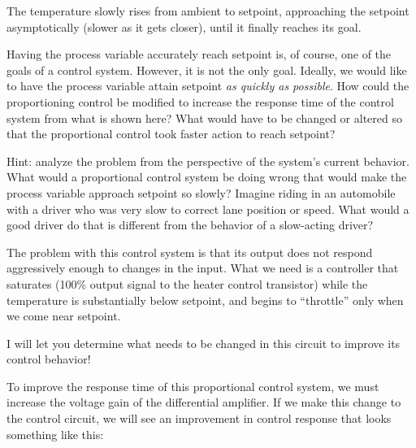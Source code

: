 The temperature slowly rises from ambient to setpoint, approaching the setpoint asymptotically (slower as it gets closer), until it finally reaches its goal.

Having the process variable accurately reach setpoint is, of course, one of the goals of a control system.  However, it is not the only goal.  Ideally, we would like to have the process variable attain setpoint {\it as quickly as possible}.  How could the proportioning control be modified to increase the response time of the control system from what is shown here?  What would have to be changed or altered so that the proportional control took faster action to reach setpoint?

Hint: analyze the problem from the perspective of the system's current behavior.  What would a proportional control system be doing wrong that would make the process variable approach setpoint so slowly?  Imagine riding in an automobile with a driver who was very slow to correct lane position or speed.  What would a good driver do that is different from the behavior of a slow-acting driver?
 






The problem with this control system is that its output does not respond aggressively enough to changes in the input.  What we need is a controller that saturates (100\% output signal to the heater control transistor) while the temperature is substantially below setpoint, and begins to ``throttle'' only when we come near setpoint.  

I will let you determine what needs to be changed in this circuit to improve its control behavior!  







To improve the response time of this proportional control system, we must increase the voltage gain of the differential amplifier.  If we make this change to the control circuit, we will see an improvement in control response that looks something like this:

